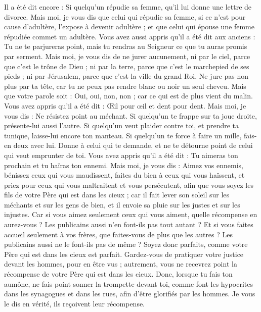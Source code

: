 \begin{multicols}{2}
Il a été dit encore : Si quelqu'un répudie sa femme, qu'il lui donne une lettre de divorce.
Mais moi, je vous dis que celui qui répudie sa femme, si ce n'est pour cause d'adultère, l'expose à devenir adultère ; et que celui qui épouse une femme répudiée commet un adultère.
Vous avez aussi appris qu'il a été dit aux anciens : Tu ne te parjureras point, mais tu rendras au Seigneur ce que tu auras promis par serment.
Mais moi, je vous dis de ne jurer aucunement, ni par le ciel, parce que c'est le trône de Dieu ;
ni par la terre, parce que c'est le marchepied de ses pieds ; ni par Jérusalem, parce que c'est la ville du grand Roi.
Ne jure pas non plus par ta tête, car tu ne peux pas rendre blanc ou noir un seul cheveu.
Mais que votre parole soit : Oui, oui, non, non ; car ce qui est de plus vient du malin.
Vous avez appris qu'il a été dit : Œil pour œil et dent pour dent.
Mais moi, je vous dis : Ne résistez point au méchant. Si quelqu'un te frappe sur ta joue droite, présente-lui aussi l'autre.
Si quelqu'un veut plaider contre toi, et prendre ta tunique, laisse-lui encore ton manteau.
Si quelqu'un te force à faire un mille, fais-en deux avec lui.
Donne à celui qui te demande, et ne te détourne point de celui qui veut emprunter de toi.
Vous avez appris qu'il a été dit : Tu aimeras ton prochain et tu haïras ton ennemi.
Mais moi, je vous dis : Aimez vos ennemis, bénissez ceux qui vous maudissent, faites du bien à ceux qui vous haïssent, et priez pour ceux qui vous maltraitent et vous persécutent,
afin que vous soyez les fils de votre Père qui est dans les cieux ; car il fait lever son soleil sur les méchants et sur les gens de bien, et il envoie sa pluie sur les justes et sur les injustes.
Car si vous aimez seulement ceux qui vous aiment, quelle récompense en aurez-vous ? Les publicains aussi n'en font-ils pas tout autant ?
Et si vous faites accueil seulement à vos frères, que faites-vous de plus que les autres ? Les publicains aussi ne le font-ils pas de même ?
Soyez donc parfaits, comme votre Père qui est dans les cieux est parfait.
\VerseOne{}Gardez-vous de pratiquer votre justice devant les hommes, pour en être vus ; autrement, vous ne recevrez point la récompense de votre Père qui est dans les cieux.
Donc, lorsque tu fais ton aumône, ne fais point sonner la trompette devant toi, comme font les hypocrites dans les synagogues et dans les rues, afin d'être glorifiés par les hommes. Je vous le dis en vérité, ils reçoivent leur récompense.

\end{multicols}
